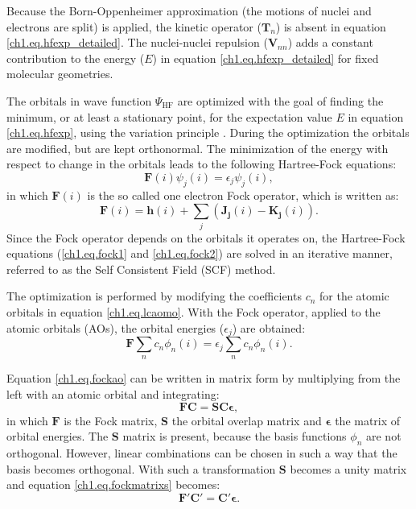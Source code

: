 Because the Born-Oppenheimer approximation (the motions of nuclei and electrons are split) is applied, the kinetic operator ($\mathbf{T}_{n}$) is absent in equation \ref{ch1.eq.hfexp_detailed}. The nuclei-nuclei repulsion ($\mathbf{V}_{nn}$) adds a constant contribution to the energy ($E$) in equation \ref{ch1.eq.hfexp_detailed} for fixed molecular geometries.

The orbitals in wave function $\Psi_\mathrm{HF}$ are optimized with the goal of finding the minimum, or at least a stationary point, for the expectation value $E$ in equation \ref{ch1.eq.hfexp}, using the variation principle \cite{varia}. During the optimization the orbitals are modified, but are kept orthonormal. The minimization of the energy with respect to change in the orbitals leads to the following Hartree-Fock equations:
\begin{equation}
\mathbf{F}(i)\psi_j(i)=\epsilon_j \psi_j(i),
\label{ch1.eq.fock1}
\end{equation}
in which $\mathbf{F}(i)$ is the so called one electron Fock operator, which is written as:
\begin{equation}
\mathbf{F}(i)=\mathbf{h}(i) + \sum_j (\mathbf{J_j}(i) - \mathbf{K_j}(i)).
\label{ch1.eq.fock2}
\end{equation}
Since the Fock operator depends on the orbitals it operates on, the Hartree-Fock equations (\ref{ch1.eq.fock1} and \ref{ch1.eq.fock2}) are solved in an iterative manner, referred to as the Self Consistent Field (SCF) method.

The optimization is performed by modifying the coefficients $c_n$ for the atomic orbitals in equation \ref{ch1.eq.lcaomo}. With the Fock operator, applied to the atomic orbitals (AOs), the orbital energies ($\epsilon_j$) are obtained:
\begin{equation}
\mathbf{F}\sum_n c_n \phi_n (i) = \epsilon_j \sum_n c_n \phi_n (i).
\label{ch1.eq.fockao}
\end{equation}

Equation \ref{ch1.eq.fockao} can be written in matrix form by multiplying from the left with an atomic orbital and integrating:
\begin{equation}
\mathbf{F}\mathbf{C} = \mathbf{S}\mathbf{C}\mathbf{\epsilon},
\label{ch1.eq.fockmatrixs}
\end{equation}
in which $\mathbf{F}$ is the Fock matrix, $\mathbf{S}$ the orbital overlap matrix and $\mathbf{\epsilon}$ the matrix of orbital energies. The $\mathbf{S}$ matrix is present, because the basis functions $\phi_n$ are not orthogonal. However, linear combinations can be chosen in such a way that the basis becomes orthogonal. With such a transformation $\mathbf{S}$ becomes a unity matrix and equation \ref{ch1.eq.fockmatrixs} becomes:
\begin{equation}
\mathbf{F'}\mathbf{C'} = \mathbf{C'}\mathbf{\epsilon}.
\end{equation}

